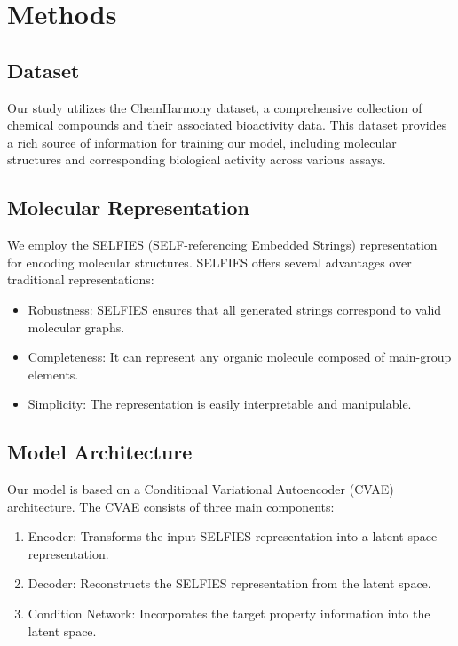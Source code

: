 \section{Methods}

\subsection{Dataset}

Our study utilizes the ChemHarmony dataset, a comprehensive collection of chemical compounds and their associated bioactivity data. This dataset provides a rich source of information for training our model, including molecular structures and corresponding biological activity across various assays.

\subsection{Molecular Representation}

We employ the SELFIES (SELF-referencing Embedded Strings) representation for encoding molecular structures. SELFIES offers several advantages over traditional representations:

\begin{itemize}
    \item Robustness: SELFIES ensures that all generated strings correspond to valid molecular graphs.
    \item Completeness: It can represent any organic molecule composed of main-group elements.
    \item Simplicity: The representation is easily interpretable and manipulable.
\end{itemize}

\subsection{Model Architecture}

Our model is based on a Conditional Variational Autoencoder (CVAE) architecture. The CVAE consists of three main components:

\begin{enumerate}
    \item Encoder: Transforms the input SELFIES representation into a latent space representation.
    \item Decoder: Reconstructs the SELFIES representation from the latent space.
    \item Condition Network: Incorporates the target property information into the latent space.
\end{enumerate}


